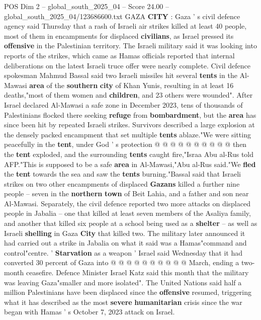 \begin{textsample}{POS Dim 2 – global\_south\_2025\_04 – Score 24.00 – global\_south\_2025\_04/123686600.txt}  \label{ex:f2_pos_276}
GAZA \textbf{CITY} : Gaza ' s civil defence agency said Thursday that a rash of Israeli air strikes killed at least 40 people, most of them in encampments for displaced \textbf{civilians}, as Israel pressed its \textbf{offensive} in the Palestinian territory.
The Israeli military said it was looking into reports of the strikes, which came as Hamas officials reported that internal deliberations on the latest Israeli truce offer were nearly complete.
Civil defence spokesman Mahmud Bassal said two Israeli missiles hit several \textbf{tents} in the Al-Mawasi \textbf{area} of the \textbf{southern} \textbf{city} of Khan Yunis, resulting in at least 16 deaths,"most of them women and \textbf{children}, and 23 others were wounded".
After Israel declared Al-Mawasi a safe zone in December 2023, tens of thousands of Palestinians flocked there seeking \textbf{refuge} from \textbf{bombardment}, but the \textbf{area} has since been hit by repeated Israeli strikes.
Survivors described a large explosion at the densely packed encampment that set multiple \textbf{tents} ablaze."We were sitting peacefully in the \textbf{tent}, under God ' s protection @ @ @ @ @ @ @ @ @ @ then the \textbf{tent} exploded, and the surrounding \textbf{tents} caught fire,"Israa Abu al-Rus told AFP."This is supposed to be a safe \textbf{area} in Al-Mawasi,"Abu al-Rus said."We \textbf{fled} the \textbf{tent} towards the sea and saw the \textbf{tents} burning."Bassal said that Israeli strikes on two other encampments of displaced \textbf{Gazans} killed a further nine people -- seven in the \textbf{northern} \textbf{town} of Beit Lahia, and a father and son near Al-Mawasi.
Separately, the civil defence reported two more attacks on displaced people in Jabalia -- one that killed at least seven members of the Asaliya family, and another that killed six people at a school being used as a \textbf{shelter} -- as well as Israeli \textbf{shelling} in Gaza \textbf{City} that killed two.
The military later announced it had carried out a strike in Jabalia on what it said was a Hamas"command and control"centre. ' \textbf{Starvation} as a weapon ' Israel said Wednesday that it had converted 30 percent of Gaza into @ @ @ @ @ @ @ @ @ @ March, ending a two-month ceasefire.
Defence Minister Israel Katz said this month that the military was leaving Gaza"smaller and more isolated".
The United Nations said half a million Palestinians have been displaced since the \textbf{offensive} resumed, triggering what it has described as the most \textbf{severe} \textbf{humanitarian} crisis since the war began with Hamas ' s October 7, 2023 attack on Israel.

\end{textsample}
